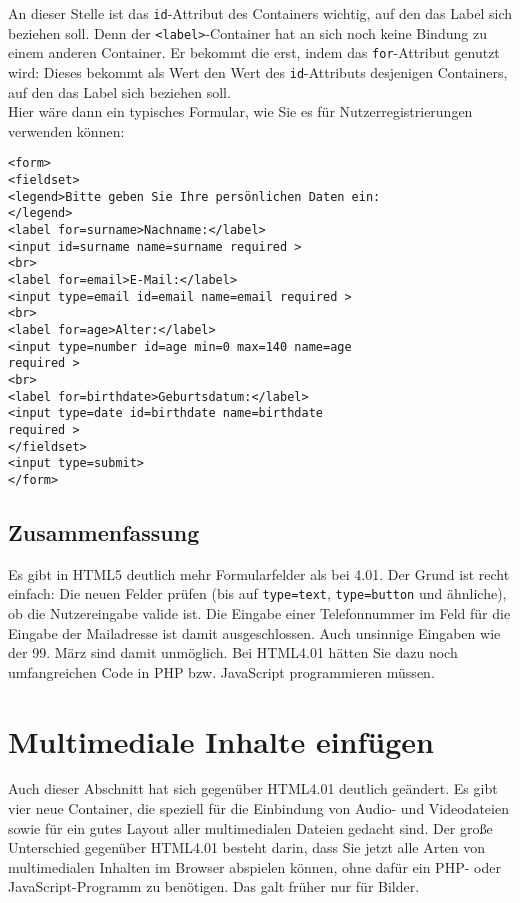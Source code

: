 An dieser Stelle ist das \verb|id|-Attribut des Containers wichtig, auf den das Label sich beziehen soll. Denn der \verb|<label>|-Container hat an sich noch keine Bindung zu einem anderen Container. Er bekommt die erst, indem das \verb|for|-Attribut genutzt wird: Dieses bekommt als Wert den Wert des \verb|id|-Attributs desjenigen Containers, auf den das Label sich beziehen soll.\\

Hier wäre dann ein typisches Formular, wie Sie es für Nutzerregistrierungen verwenden können:\\

\begin{verbatim}
<form>
<fieldset>
<legend>Bitte geben Sie Ihre persönlichen Daten ein:
</legend>
<label for=surname>Nachname:</label>
<input id=surname name=surname required >
<br>
<label for=email>E-Mail:</label>
<input type=email id=email name=email required >
<br>
<label for=age>Alter:</label>
<input type=number id=age min=0 max=140 name=age 
required >
<br>
<label for=birthdate>Geburtsdatum:</label>
<input type=date id=birthdate name=birthdate 
required >
</fieldset>
<input type=submit>
</form>          
\end{verbatim}

\subsection{Zusammenfassung}

Es gibt in HTML5 deutlich mehr Formularfelder als bei 4.01. Der Grund ist recht einfach: Die neuen Felder prüfen (bis auf \verb|type=text|, \verb|type=button| und ähnliche), ob die Nutzereingabe valide ist. Die Eingabe einer Telefonnummer im Feld für die Eingabe der Mailadresse ist damit ausgeschlossen. Auch unsinnige Eingaben wie der 99. März sind damit unmöglich. Bei HTML4.01 hätten Sie dazu noch umfangreichen Code in PHP bzw. JavaScript programmieren müssen.

\section{Multimediale Inhalte einfügen}

Auch dieser Abschnitt hat sich gegenüber HTML4.01 deutlich geändert. Es gibt vier neue Container, die speziell für die Einbindung von Audio- und Videodateien sowie für ein gutes Layout aller multimedialen Dateien gedacht sind. Der große Unterschied gegenüber HTML4.01 besteht darin, dass Sie jetzt alle Arten von multimedialen Inhalten im Browser abspielen können, ohne dafür ein PHP- oder JavaScript-Programm zu benötigen. Das galt früher nur für Bilder.\\

